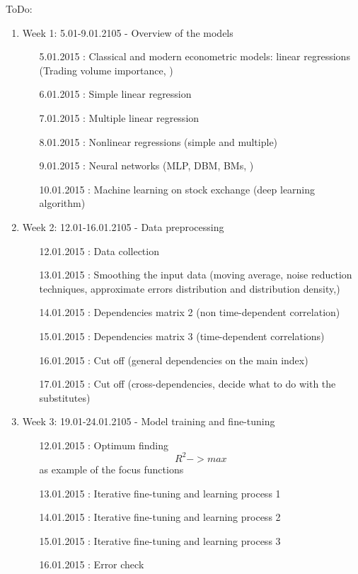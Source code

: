 \documentclass {article}
\begin{document}
ToDo:
\begin{enumerate}
	\item Week 1: 5.01-9.01.2105 - Overview of the models 
	\begin{enumerate}
		\item[5.01.2015]: Classical and modern econometric models:  linear regressions (Trading volume importance, ) 
		\item[6.01.2015]: Simple linear regression 	 		  
		\item[7.01.2015]: Multiple linear regression  
		\item[8.01.2015]: Nonlinear regressions (simple and multiple)
		\item[9.01.2015]: Neural networks (MLP, DBM, BMs, )
		\item[10.01.2015]: Machine learning on stock exchange (deep learning algorithm)
	\end{enumerate}
	\item Week 2: 12.01-16.01.2105 - Data preprocessing
	\begin{enumerate}
		\item[12.01.2015]: Data collection
		\item[13.01.2015]: Smoothing the input data (moving average, noise reduction techniques, approximate errors distribution and distribution density,)
		\item[14.01.2015]: Dependencies matrix 2 (non time-dependent correlation)
		\item[15.01.2015]: Dependencies matrix 3 (time-dependent correlations)
		\item[16.01.2015]: Cut off (general dependencies on the main index)
		\item[17.01.2015]: Cut off (cross-dependencies, decide what to do with the substitutes)
	\end{enumerate}
	\item Week 3: 19.01-24.01.2105 - Model training and fine-tuning
	\begin{enumerate}
		\item[12.01.2015]: Optimum finding  \[ R^2 -> max \] as example of the focus functions
		\item[13.01.2015]: Iterative fine-tuning and learning process 1
		\item[14.01.2015]: Iterative fine-tuning and learning process 2
		\item[15.01.2015]: Iterative fine-tuning and learning process 3
		\item[16.01.2015]: Error check
	\end{enumerate}

\end{enumerate}
\end{document}
